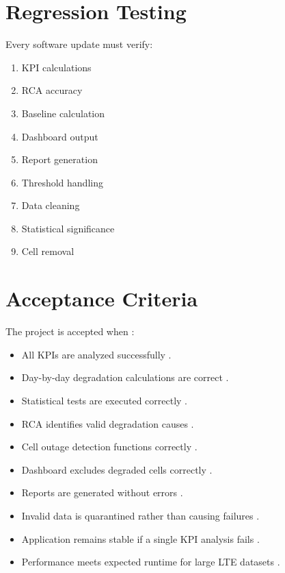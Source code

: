 \section{Regression Testing}
Every software update must verify:
\begin{enumerate}
    \item KPI calculations
    \item RCA accuracy
    \item Baseline calculation
    \item Dashboard output
    \item Report generation 
    \item Threshold handling 
    \item Data cleaning 
    \item Statistical significance 
    \item Cell removal 
\end{enumerate}

\section{Acceptance Criteria}
The project is accepted when :
\begin{itemize}
    \item All KPIs are analyzed successfully .
    \item Day-by-day degradation calculations are correct .
    \item Statistical tests are executed correctly .
    \item RCA identifies valid degradation causes .
    \item Cell outage detection functions correctly .
    \item Dashboard excludes degraded cells correctly .
    \item Reports are generated without errors .
    \item Invalid data is quarantined rather than causing failures .
    \item Application remains stable if a single KPI analysis fails .
    \item Performance meets expected runtime for large LTE datasets .
\end{itemize}

